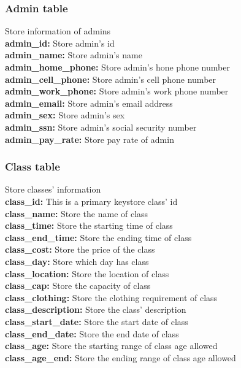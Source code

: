 \subsubsection{Admin table}
Store information of admins\\
\textbf{admin\_id:} Store admin's id\\
\textbf{admin\_name:} Store admin's name\\
\textbf{admin\_home\_phone:} Store admin's hone phone number\\
\textbf{admin\_cell\_phone:} Store admin's cell phone number\\
\textbf{admin\_work\_phone:} Store admin's work phone number\\
\textbf{admin\_email:} Store admin's email address\\
\textbf{admin\_sex:} Store admin's sex\\
\textbf{admin\_ssn:} Store admin's social security number\\
\textbf{admin\_pay\_rate:} Store pay rate of admin

\subsubsection{Class table}
Store classes' information\\
\textbf{class\_id:} This is a primary keystore class' id\\
\textbf{class\_name:} Store the name of class \\
\textbf{class\_time:} Store the starting time of class\\
\textbf{class\_end\_time:} Store the ending time of class\\
\textbf{class\_cost:} Store the price of the class\\
\textbf{class\_day:} Store which day has class\\
\textbf{class\_location:} Store the location of class\\
\textbf{class\_cap:} Store the capacity of class\\
\textbf{class\_clothing:} Store the clothing requirement of class\\
\textbf{class\_description:} Store the class' description\\
\textbf{class\_start\_date:} Store the start date of class\\
\textbf{class\_end\_date:} Store the end date of class\\
\textbf{class\_age:} Store the starting range of class age allowed\\
\textbf{class\_age\_end:} Store the ending range of class age allowed

